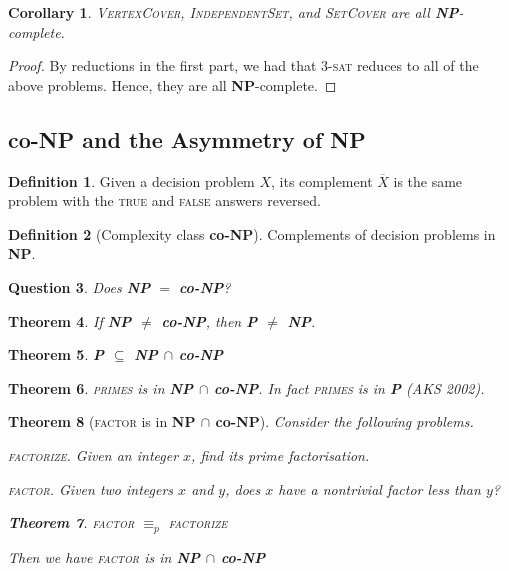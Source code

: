 \documentclass[10pt, oneside, reqno]{amsart}
\theoremstyle{plain}%
\newtheorem{thm}{Theorem}[section]
\newtheorem{question}[thm]{Question}
\newtheorem*{cor}{Corollary}
\theoremstyle{definition}
\newtheorem{defn}[thm]{Definition}
\theoremstyle{remark}
\begin{document}
\begin{cor}
	\textsc{VertexCover}, \textsc{IndependentSet}, and \textsc{SetCover} are all \textbf{NP}-complete.
\end{cor}

\begin{proof}
	By reductions in the first part, we had that \textsc{3-sat} reduces to all of the above problems.  Hence, they are all \textbf{NP}-complete.
\end{proof}

\subsection{co-\textbf{NP} and the Asymmetry of \textbf{NP}} %
\label{sub:coNP}

\begin{defn}
	Given a decision problem $X$, its complement $\overline{X}$ is the same problem with the \textsc{true} and \textsc{false} answers reversed.
\end{defn}

\begin{defn}[Complexity class \textbf{co-}\textbf{NP}]
	Complements of decision problems in \textbf{NP}.
\end{defn}

\begin{question}
	Does \textbf{NP} $=$ \textbf{co-\textbf{NP}}?
\end{question}


\begin{thm}
	If \textbf{NP $\neq$ co-NP}, then \textbf{P $\neq$ NP}.
\end{thm}

\begin{thm}
	\textbf{P $\subseteq$ NP $\cap$ \textbf{co-NP}}
\end{thm}

\begin{thm}
	\textsc{primes} is in \textbf{NP $\cap$ co-NP}. In fact \textsc{primes} is in \textbf{P} (AKS 2002).
\end{thm}

\begin{thm}[\textsc{factor} is in \textbf{NP $\cap$ co-NP}]Consider the following problems.
	
	\textsc{factorize}.  Given an integer $x$, find its prime factorisation.
	
	\textsc{factor}.  Given two integers $x$ and $y$, does $x$ have a nontrivial factor less than $y$?
		
\begin{thm}
	\textsc{factor} $\equiv_p$ \textsc{factorize}
\end{thm}

Then we have \textsc{factor} is in \textbf{NP $\cap$ co-NP}
\end{thm}
\end{document}
